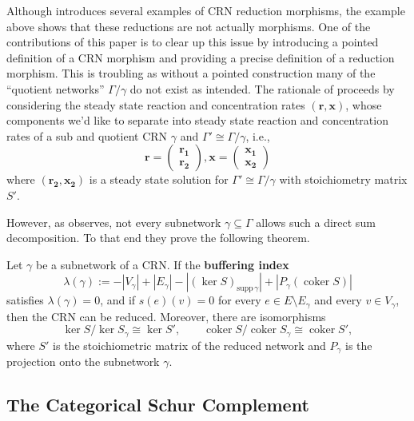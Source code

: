 \documentclass[11pt, one side, article]{memoir}
\newcommand{\define}[1]{\textbf{#1}}
\begin{document}
Although \cite{Hirono2021} introduces several examples of CRN reduction morphisms, the example above shows that these reductions are not actually morphisms. One of the contributions of this paper is to clear up this issue by introducing a pointed definition of a CRN morphism and providing a precise definition of a reduction morphism.
This is troubling as without a pointed construction many of the ``quotient networks'' $\Gamma/\gamma$ do not exist as intended.
The rationale of \cite{Hirono2021} proceeds by considering the steady state reaction and concentration rates $(\mathbf{r},\mathbf{x})$, whose components we'd like to separate into steady state reaction and concentration rates of a sub and quotient CRN $\gamma$ and $\Gamma'\cong \Gamma / \gamma$, i.e.,
\begin{equation*}
    \mathbf{r}=
    \begin{pmatrix}
        \mathbf{r_1} \\
        \mathbf{r_2}
    \end{pmatrix}
    ,
    \mathbf{x}=
    \begin{pmatrix}
        \mathbf{x_1} \\
        \mathbf{x_2}
    \end{pmatrix}    
\end{equation*}
where $(\mathbf{r_2},\mathbf{x_2})$ is a steady state solution for $\Gamma'\cong \Gamma / \gamma$ with stoichiometry matrix $S'$.

However, as \cite{Hirono2021} observes, not every subnetwork $\gamma \subseteq \Gamma$ allows such a direct sum decomposition.
To that end they prove the following theorem.
\begin{theorem}
\label{thm:reduction}
Let \(\gamma\) be a subnetwork of a CRN. If the \define{buffering index}
\[
\lambda(\gamma)
:= -|V_\gamma| + |E_\gamma| - |(\ker S)_{\mathrm{supp}\,\gamma}| + |P_{\gamma}(\operatorname{coker} S)|
\]
satisfies \(\lambda(\gamma)=0\), and if \(s(e)(v)=0\) for every \(e \in E\setminus E_\gamma\) and every \(v \in V_\gamma\), then the CRN can be reduced. Moreover, there are isomorphisms
\[
\ker S / \ker S_\gamma \cong \ker S',
\qquad
\operatorname{coker} S / \operatorname{coker} S_\gamma \cong \operatorname{coker} S',
\]
where \(S'\) is the stoichiometric matrix of the reduced network and \(P_\gamma\) is the projection onto the subnetwork \(\gamma\).
\end{theorem}

\subsection{The Categorical Schur Complement}
\end{document}
